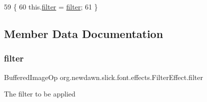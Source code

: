 \begin{DoxyCode}
59                                                   \{
60         this.\mbox{\hyperlink{classorg_1_1newdawn_1_1slick_1_1font_1_1effects_1_1_filter_effect_aafe0a98e55b983f1b26e5ed235d254be}{filter}} = \mbox{\hyperlink{classorg_1_1newdawn_1_1slick_1_1font_1_1effects_1_1_filter_effect_aafe0a98e55b983f1b26e5ed235d254be}{filter}};
61     \}
\end{DoxyCode}


\subsection{Member Data Documentation}
\mbox{\label{classorg_1_1newdawn_1_1slick_1_1font_1_1effects_1_1_filter_effect_aafe0a98e55b983f1b26e5ed235d254be}} 
\subsubsection{\texorpdfstring{filter}{filter}}
{\footnotesize\ttfamily Buffered\+Image\+Op org.\+newdawn.\+slick.\+font.\+effects.\+Filter\+Effect.\+filter\hspace{0.3cm}{\ttfamily [private]}}

The filter to be applied 